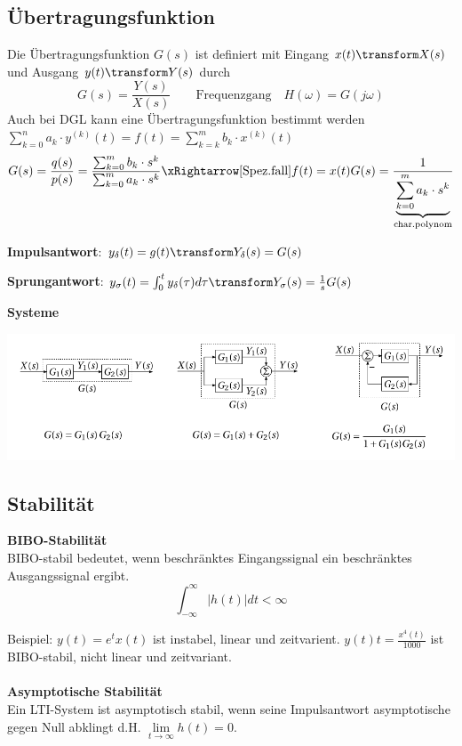 \subsection{Übertragungsfunktion}\label{ü-funktion}
Die Übertragungsfunktion $G(s)$ ist definiert mit Eingang $x(t) \transform X(s)$ und Ausgang $y(t) \transform Y(s)$ durch 
\[G(s) = \frac{Y(s)}{X(s)} \qquad \text{Frequenzgang}\quad H(\omega) = G(j\omega)\]
Auch bei DGL kann eine Übertragungsfunktion bestimmt werden $\sum_{k=0}^{n}a_k\cdot y^{(k)}(t) = f(t) = \sum_{k=k}^{m}b_k\cdot x^{(k)}(t)$
\[
	G(s) = \frac{q(s)}{p(s)} = \frac{\sum_{k=0}^{m}b_k\cdot s^k}{\sum_{k=0}^{m}a_k\cdot s^k} \xRightarrow[\text{Spez.fall}]{f(t) = x(t)} G(s)=  \frac{1}{\underbrace{\sum_{k=0}^{m}a_k\cdot s^k}_\text{char.polynom}}
\]

\noindent\textbf{Impulsantwort}: $y_{\delta}(t) =  g(t) \transform Y_\delta(s) = G(s)$

\noindent\textbf{Sprungantwort}: $y_{\sigma}(t) = \int_{0}^{t}y_\delta(\tau)d\tau \transform Y_\sigma(s) = \frac{1}{s}G(s)$

\noindent\textbf{Systeme}\\
\begin{center}
	\includegraphics[width=\columnwidth]{Images/systeme}
\end{center}


\subsection{Stabilität}
\textbf{BIBO-Stabilität}\\
BIBO-stabil bedeutet, wenn beschränktes Eingangssignal ein beschränktes Ausgangssignal ergibt.
\[
\int_{-\infty}^{\infty}\left|h(t)\right|dt < \infty
\]

Beispiel: $y(t) = e^tx(t)$ ist instabel, linear und zeitvarient. $y(t)t = \frac{x^4(t)}{1000}$ ist BIBO-stabil, nicht linear und zeitvariant.
\\ ~\\
\textbf{Asymptotische Stabilität}\\
Ein LTI-System ist asymptotisch stabil, wenn seine Impulsantwort asymptotische gegen Null abklingt d.H. $\lim\limits_{t\rightarrow\infty}h(t) = 0$.

